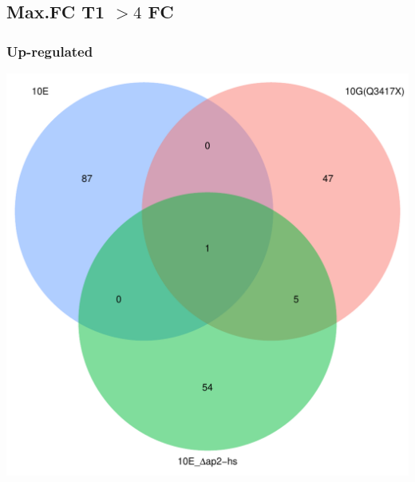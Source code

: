 \documentclass{article}\usepackage[]{graphicx}\usepackage[]{color}
\newenvironment{knitrout}{}{} %
\begin{document}
\clearpage

\subsection{Max.FC T1 $>4$ FC}
\subsubsection{Up-regulated}

\begin{knitrout}
\color{fgcolor}

{\centering \includegraphics[width=1\linewidth,height=.4\textheight]{figure/minimal-venn_t1_3fc_up_venn-1} 

}



\end{knitrout}
\end{document}
